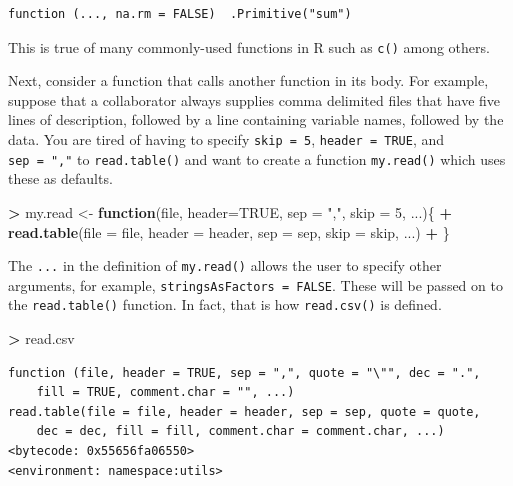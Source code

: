 \documentclass[
]{krantz}
\makeatletter
\newenvironment{Shaded}{\begin{snugshade}}{\end{snugshade}}
\newcommand{\ControlFlowTok}[1]{\textcolor[rgb]{0.27,0.27,0.27}{\textbf{#1}}}
\newcommand{\DataTypeTok}[1]{\textcolor[rgb]{0.27,0.27,0.27}{#1}}
\newcommand{\DecValTok}[1]{\textcolor[rgb]{0.06,0.06,0.06}{#1}}
\newcommand{\KeywordTok}[1]{\textcolor[rgb]{0.27,0.27,0.27}{\textbf{#1}}}
\newcommand{\NormalTok}[1]{#1}
\newcommand{\OperatorTok}[1]{\textcolor[rgb]{0.43,0.43,0.43}{\textbf{#1}}}
\newcommand{\OtherTok}[1]{\textcolor[rgb]{0.37,0.37,0.37}{#1}}
\newcommand{\StringTok}[1]{\textcolor[rgb]{0.5,0.5,0.5}{#1}}
\newenvironment{kframe}{%
\medskip{}
\setlength{\fboxsep}{.8em}
 \def\at@end@of@kframe{}%
 \ifinner\ifhmode%
  \def\at@end@of@kframe{\end{minipage}}%
  \begin{minipage}{\columnwidth}%
 \fi\fi%
 \def\FrameCommand##1{\hskip\@totalleftmargin \hskip-\fboxsep
 \colorbox{shadecolor}{##1}\hskip-\fboxsep
     \hskip-\linewidth \hskip-\@totalleftmargin \hskip\columnwidth}%
 \MakeFramed {\advance\hsize-\width
   \@totalleftmargin\z@ \linewidth\hsize
   \@setminipage}}%
 {\par\unskip\endMakeFramed%
 \at@end@of@kframe}
\renewenvironment{Shaded}{\begin{kframe}}{\end{kframe}}
\makeatother
\begin{document}
\begin{verbatim}
function (..., na.rm = FALSE)  .Primitive("sum")
\end{verbatim}

This is true of many commonly-used functions in R such as \texttt{c()} among others.

Next, consider a function that calls another function in its body. For example, suppose that a collaborator always supplies comma delimited files that have five lines of description, followed by a line containing variable names, followed by the data. You are tired of having to specify \texttt{skip\ =\ 5}, \texttt{header\ =\ TRUE}, and \texttt{sep\ =\ ","} to \texttt{read.table()} and want to create a function \texttt{my.read()} which uses these as defaults.

\begin{Shaded}
\begin{Highlighting}[]
\OperatorTok{\textgreater{}}\StringTok{ }\NormalTok{my.read \textless{}{-}}\StringTok{ }\ControlFlowTok{function}\NormalTok{(file, }\DataTypeTok{header=}\OtherTok{TRUE}\NormalTok{, }\DataTypeTok{sep =} \StringTok{","}\NormalTok{, }\DataTypeTok{skip =} \DecValTok{5}\NormalTok{, ...)\{}
\OperatorTok{+}\StringTok{     }\KeywordTok{read.table}\NormalTok{(}\DataTypeTok{file =}\NormalTok{ file, }\DataTypeTok{header =}\NormalTok{ header, }\DataTypeTok{sep =}\NormalTok{ sep, }\DataTypeTok{skip =}\NormalTok{ skip, ...)}
\OperatorTok{+}\StringTok{ }\NormalTok{\}}
\end{Highlighting}
\end{Shaded}

The \texttt{...} in the definition of \texttt{my.read()} allows the user to specify other arguments, for example, \texttt{stringsAsFactors\ =\ FALSE}. These will be passed on to the \texttt{read.table()} function. In fact, that is how \texttt{read.csv()} is defined.

\begin{Shaded}
\begin{Highlighting}[]
\OperatorTok{\textgreater{}}\StringTok{ }\NormalTok{read.csv}
\end{Highlighting}
\end{Shaded}

\begin{verbatim}
function (file, header = TRUE, sep = ",", quote = "\"", dec = ".", 
    fill = TRUE, comment.char = "", ...) 
read.table(file = file, header = header, sep = sep, quote = quote, 
    dec = dec, fill = fill, comment.char = comment.char, ...)
<bytecode: 0x55656fa06550>
<environment: namespace:utils>
\end{verbatim}
\end{document}

